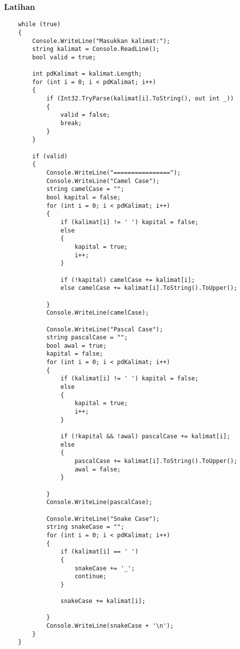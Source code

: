 \documentclass{book}
\begin{document}
	\subsubsection{Latihan}
	\begin{lstlisting}
	while (true)
	{
		Console.WriteLine("Masukkan kalimat:");
		string kalimat = Console.ReadLine();
		bool valid = true;
		
		int pdKalimat = kalimat.Length;
		for (int i = 0; i < pdKalimat; i++)
		{
			if (Int32.TryParse(kalimat[i].ToString(), out int _))
			{
				valid = false;
				break;
			}
		}
		
		if (valid)
		{
			Console.WriteLine("================");
			Console.WriteLine("Camel Case");
			string camelCase = "";
			bool kapital = false;
			for (int i = 0; i < pdKalimat; i++)
			{
				if (kalimat[i] != ' ') kapital = false;
				else
				{
					kapital = true;
					i++;
				}
				
				if (!kapital) camelCase += kalimat[i];
				else camelCase += kalimat[i].ToString().ToUpper();
				
			}
			Console.WriteLine(camelCase);
			
			Console.WriteLine("Pascal Case");
			string pascalCase = "";
			bool awal = true;
			kapital = false;
			for (int i = 0; i < pdKalimat; i++)
			{
				if (kalimat[i] != ' ') kapital = false;
				else
				{
					kapital = true;
					i++;
				}
				
				if (!kapital && !awal) pascalCase += kalimat[i];
				else
				{
					pascalCase += kalimat[i].ToString().ToUpper();
					awal = false;
				}
				
			}
			Console.WriteLine(pascalCase);
			
			Console.WriteLine("Snake Case");
			string snakeCase = "";
			for (int i = 0; i < pdKalimat; i++)
			{
				if (kalimat[i] == ' ')
				{
					snakeCase += '_';
					continue;
				}
				
				snakeCase += kalimat[i];
				
			}
			Console.WriteLine(snakeCase + '\n');
		}
	}
	\end{lstlisting}
	
\end{document}
